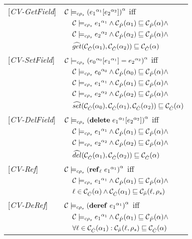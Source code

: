 \begin{table}[tlb]
\begin{tabular} {l l l l}
{[\textit{CV-GetField}]}&\multicolumn{3}{l}{$\ccestl {\lookup {\lbt 1} {\lbt 2}} $ iff}\\
&&\multicolumn{2}{l}{$ \ccest {\lbt1} \wedge \Pat(\all_1) \sqsubseteq \Pat(\all) \wedge$}\\
&&\multicolumn{2}{l}{$ \ccest {\lbt 2} \wedge \Pat(\all_2) \sqsubseteq \Pat(\all) \wedge$} \\
&&\multicolumn{2}{l}{$\widehat{get} (\Cat(\all_1), \Cat(\all_2)) \sqsubseteq \Cat(\all)$} \\
{[\textit{CV-SetField}]}&\multicolumn{3}{l}{$\ccestl {\store {\lbt 0} {\lbt 1} {\lbt 2}} $ iff}\\
&&\multicolumn{2}{l}{$ \ccest {\lbt 0} \wedge \Pat(\all_0) \sqsubseteq \Pat(\all) \wedge$}\\
&&\multicolumn{2}{l}{$ \ccest {\lbt 1} \wedge \Pat(\all_1) \sqsubseteq \Pat(\all) \wedge$} \\
&&\multicolumn{2}{l}{$ \ccest {\lbt 2} \wedge \Pat(\all_2) \sqsubseteq \Pat(\all) \wedge$} \\
&&\multicolumn{2}{l}{$\widehat{set} (\Cat(\all_0), \Cat(\all_1), \Cat(\all_2)) \sqsubseteq \Cat(\all)$} \\
{[\textit{CV-DelField}]}&\multicolumn{3}{l}{$\ccestl {\delete {\lbt 1} {\lbt 2}} $ iff}\\ 
&&\multicolumn{2}{l}{$ \ccest {\lbt 1} \wedge \Pat(\all_1) \sqsubseteq \Pat(\all) \wedge$}\\
&&\multicolumn{2}{l}{$ \ccest {\lbt 2} \wedge \Pat(\all_2) \sqsubseteq \Pat(\all) \wedge$} \\
&&\multicolumn{2}{l}{$\widehat{del} (\Cat(\all_1), \Cat(\all_2)) \sqsubseteq \Cat(\all)$}\\
{[\textit{CV-Ref}]}&\multicolumn{3}{l}{$ \ccestl {\newref {\ell} {\lbt 1}} $ iff}\\
&&\multicolumn{2}{l}{$\ccest {\lbt 1} \wedge \Pat(\all_1) \sqsubseteq \Pat(\all) \wedge$}\\
&&\multicolumn{2}{l}{$\ell \in \Cat(\all) \wedge \Cat(\all_1) \sqsubseteq \muat(\ell, \rho_s) $}\\
{[\textit{CV-DeRef}]}&\multicolumn{3}{l}{$\ccestl {\deref {\lbt 1}} $ iff}\\
&&\multicolumn{2}{l}{$ \ccest {\lbt 1}\wedge \Pat(\all_1) \sqsubseteq \Pat(\all) \wedge$}\\
&&\multicolumn{2}{l}{$\forall \ell \in \Cat(\all_1) :\muat(\ell, \rho_s) \sqsubseteq \Cat(\all)$} \\

\end{tabular}
\end{table}
